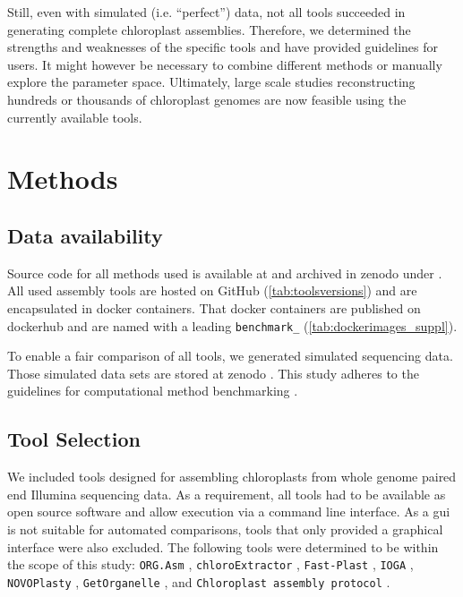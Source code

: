 \documentclass{bmcart}
\newcommand{\formatprogramnames}[1]{\texttt{#1}}
\newcommand{\ce}{\formatprogramnames{chloroExtractor}}
\newcommand{\oa}{\formatprogramnames{ORG.Asm}}
\newcommand{\fp}{\formatprogramnames{Fast-Plast}}
\newcommand{\ioga}{\formatprogramnames{IOGA}}
\newcommand{\np}{\formatprogramnames{NOVOPlasty}}
\newcommand{\go}{\formatprogramnames{GetOrganelle}}
\newcommand{\cassp}{\formatprogramnames{Chloroplast assembly protocol}}
\newcommand{\zenododataset}{\cite{zenododataset}}
\newcommand{\zenodorepo}{\cite{zenodorepo}}
\begin{document}
Still, even with simulated (i.e. ``perfect'') data, not all tools succeeded in generating complete chloroplast assemblies.
Therefore, we determined the strengths and weaknesses of the specific tools and have provided guidelines for users.
It might however be necessary to combine different methods or manually explore the parameter space.
Ultimately, large scale studies reconstructing hundreds or thousands of chloroplast genomes are now feasible using the currently available tools. 

\section*{Methods}
\subsection*{Data availability}
Source code for all methods used is available at \cite{github-benchmark-repo} and archived in zenodo under \zenodorepo{}.
All used assembly tools are hosted on GitHub (\cref{tab:toolsversions}) and are encapsulated in docker containers.
That docker containers are published on dockerhub \cite{dockerhub-benchmark} and are named with a leading \texttt{benchmark\_} (\cref{tab:dockerimages_suppl}).

To enable a fair comparison of all tools, we generated simulated sequencing data.
Those simulated data sets are stored at zenodo \zenododataset{}.
This study adheres to the guidelines for computational method benchmarking \cite{weber_essential_2018}.

\subsection*{Tool Selection}
We included tools designed for assembling chloroplasts from whole genome paired end Illumina sequencing data. As a requirement, all tools had to be available as open source software and allow execution via a command line interface. 
As a \gls{gui} is not suitable for automated comparisons, tools that only provided a graphical interface were also excluded.
The following tools were determined to be within the scope of this study:
\oa{} \cite{coissac_barcodes_2016}, 
\ce{} \cite{j_ankenbrand_chloroextractor:_2018}, 
\fp{} \cite{mckain__fast-plast_2017}, 
\ioga{} \cite{bakker_herbarium_2016}, 
\np{} \cite{dierckxsens_novoplasty:_2017}, 
\go{} \cite{jin_getorganelle:_2018}, and
\cassp{} \cite{sancho_comparative_2018}.
\end{document}
